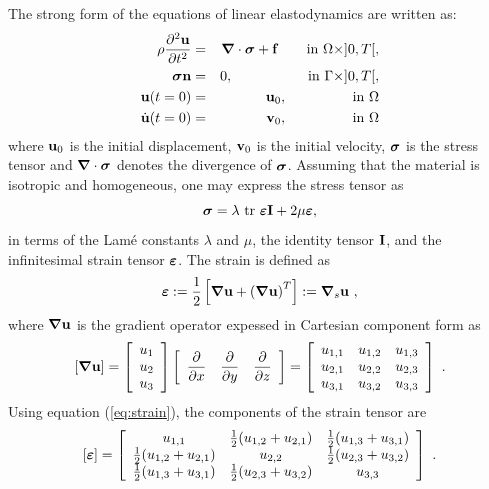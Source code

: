 The strong form of the equations of linear elastodynamics are written as:
\begin{eqnarray}
\rho\frac{\partial^2 \mathbf{u}}{\partial t^2} &=& {\boldsymbol{\nabla}}\cdot{\boldsymbol{\sigma}} + \mathbf{f} \qquad \mbox{in} ~\Omega\times]0,T[, \\
{\boldsymbol{\sigma}} \mathbf{n} &=& 0, \qquad\qquad~~~~ \mbox{in} ~\Gamma\times]0,T[, \nonumber\\
\mathbf{u}(t=0) &=& \mathbf{u}_0, \qquad\qquad~~ \mbox{in} ~\Omega \nonumber\\
\dot{\mathbf{u}}(t=0) &=& \mathbf{v}_0, \qquad\qquad~~ \mbox{in} ~\Omega \nonumber
\end{eqnarray}
where $\mathbf{u}_0$ is the initial displacement, $\mathbf{v}_0$ is the initial velocity, ${\boldsymbol{\sigma}}$ is the stress tensor and ${\boldsymbol{\nabla}}\cdot{\boldsymbol{\sigma}}$ denotes the divergence of ${\boldsymbol{\sigma}}$. Assuming that the material is isotropic and homogeneous, one may express the stress tensor as
\begin{equation}
\label{eq:stressstrain}
{\boldsymbol{\sigma}} = \lambda~\mbox{tr}~{\boldsymbol{\varepsilon}}\mathbf{I} + 2\mu{\boldsymbol{\varepsilon}},
\end{equation}
in terms of the Lam\'{e} constants $\lambda$ and $\mu$, the identity tensor $\mathbf{I}$, and the infinitesimal strain tensor ${\boldsymbol{\varepsilon}}$. The strain is defined as
\begin{equation}
\label{eq:strain}
{\boldsymbol{\varepsilon}} := \frac{1}{2}\left[ {\boldsymbol{\nabla}} \mathbf{u} + \left( {\boldsymbol{\nabla}} \mathbf{u} \right)^{T} \right] := {\boldsymbol{\nabla}}_s\mathbf{u}~,
\end{equation} 
where ${\boldsymbol{\nabla}} \mathbf{u}$ is the gradient operator expessed in Cartesian component form as
\[
[{\boldsymbol{\nabla}} \mathbf{u}] = \left[ \begin{array}{c}u_1\\u_2\\u_3\end{array}\right] 
\left[\begin{array}{ccc} \dfrac{\partial}{\partial x} & \dfrac{\partial}{\partial y} & \dfrac{\partial}{\partial z} \end{array}\right] =
\left[
\begin{array}{ccc} 
u_{1,1} & u_{1,2} & u_{1,3} \\
u_{2,1} & u_{2,2} & u_{2,3} \\
u_{3,1} & u_{3,2} & u_{3,3}
\end{array}
\right] ~.
\]
Using equation (\ref{eq:strain}), the components of the strain tensor are
\[
[{\boldsymbol{\varepsilon}}] = \left[
\begin{array}{ccc} 
u_{1,1} & \frac{1}{2}(u_{1,2}+u_{2,1}) & \frac{1}{2}(u_{1,3}+u_{3,1}) \\
\frac{1}{2}(u_{1,2}+u_{2,1}) & u_{2,2} & \frac{1}{2}(u_{2,3}+u_{3,2}) \\
\frac{1}{2}(u_{1,3}+u_{3,1}) & \frac{1}{2}(u_{2,3}+u_{3,2}) & u_{3,3}
\end{array}
\right] ~.
\]

